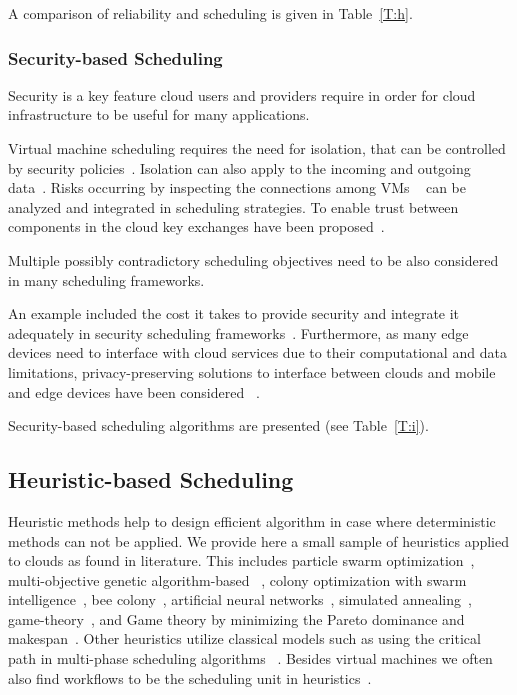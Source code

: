 \documentclass[final,5p,times,twocolumn]{elsarticle}
\begin{document}
A comparison of reliability and scheduling is given in Table~\ref{T:h}.



\subsubsection{Security-based Scheduling}\label{sec:security}


Security is a key feature cloud users and providers require in order
for cloud infrastructure to be useful for many applications.

Virtual machine scheduling requires the need for isolation, that can
be controlled by security
policies~\cite{afoulki2011security}. Isolation can also apply to the
incoming and outgoing data~\cite{chejerla2017qos,kashyap2014security}.
Risks occurring by inspecting the connections among VMs
~\cite{shetty2016security} can be analyzed and integrated in
scheduling strategies.  To enable trust between components in the
cloud key exchanges have been proposed~\cite{liu2013ccbke}.

Multiple possibly contradictory scheduling objectives need to be also
considered in many scheduling frameworks.

An example included the cost it takes to provide security and
integrate it adequately in security scheduling
frameworks~\cite{kashyap2014security,zeng2015saba,wang2012cloud}.
Furthermore, as many edge devices need to interface with cloud
services due to their computational and data limitations,
privacy-preserving solutions to interface between clouds and mobile
and edge devices have been considered ~\cite{bilogrevic2011meetings}.

Security-based scheduling algorithms are presented (see
Table~\ref{T:i}). 





\subsection{Heuristic-based Scheduling}\label{sec:heuristic}


Heuristic methods help to design efficient algorithm in case where
deterministic methods can not be applied. We provide here a small
sample of heuristics applied to clouds as found in literature. This
includes particle swarm optimization~\cite{pandey2010particle},
multi-objective genetic algorithm-based
~\cite{mezmaz2011parallel,gkasior2016metaheuristic}, colony
optimization with swarm intelligence~\cite{mateos2013aco}, bee
colony~\cite{ld2013honey}, artificial neural
networks~\cite{kousiouris2011effects}, simulated
annealing~\cite{torabzadeh2010cloud},
game-theory~\cite{gkasior2016metaheuristic}, and Game theory by
minimizing the Pareto dominance and makespan~\cite{su2013cost}.  Other
heuristics utilize classical models such as using the critical path in
multi-phase scheduling algorithms ~\cite
{abrishami2013deadline}. Besides virtual machines we often also find
workflows to be the scheduling unit in
heuristics~\cite{bousselmi2016qos}.
\end{document}

